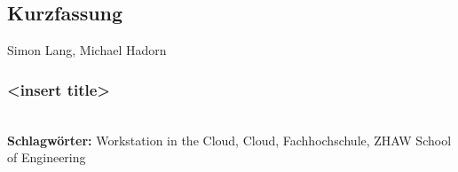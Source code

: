 
\subsection*{Kurzfassung}

Simon Lang, Michael Hadorn
\subsubsection*{<insert title>}


%
\mbox{}\\[0.5\baselineskip]\noindent
\textbf{Schlagwörter:} 
Workstation in the Cloud, Cloud, Fachhochschule, ZHAW School of Engineering
